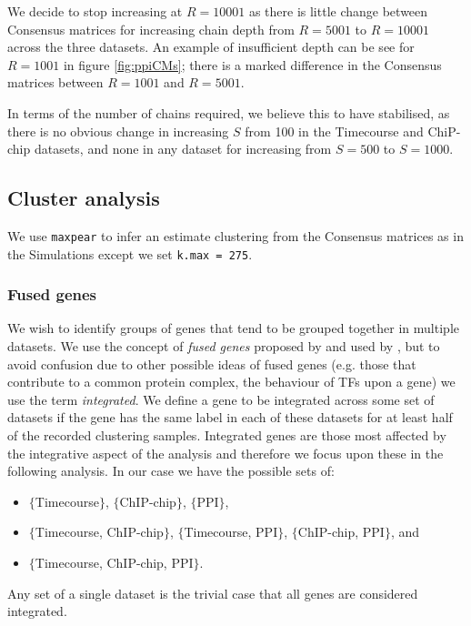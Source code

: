 \documentclass[]{article}
\begin{document}
We decide to stop increasing at $R=10001$ as there is little change between Consensus matrices for increasing chain depth from $R=5001$ to $R=10001$ across the three datasets. An example of insufficient depth can be see for $R=1001$ in figure \ref{fig:ppiCMs}; there is a marked difference in the Consensus matrices between $R=1001$ and $R=5001$. 

In terms of the number of chains required, we believe this to have stabilised, as there is no obvious change in increasing $S$ from 100 in the Timecourse and ChiP-chip datasets, and none in any dataset for increasing from $S=500$ to $S=1000$.

\subsection{Cluster analysis}
We use \texttt{maxpear} to infer an estimate clustering from the Consensus matrices as in the Simulations except we set \texttt{k.max = 275}. 



\subsubsection{Fused genes}
We wish to identify groups of genes that tend to be grouped together in multiple datasets. We use the concept of \emph{fused genes} proposed by \cite{savage2010discovering} and used by \cite{kirk2012bayesian}, but to avoid confusion due to other possible ideas of fused genes (e.g. those that contribute to a common protein complex, the behaviour of TFs upon a gene) we use the term \emph{integrated}. We define a gene to be integrated across some set of datasets if the gene has the same label in each of these datasets for at least half of the recorded clustering samples. Integrated genes are those most affected by the integrative aspect of the analysis and therefore we focus upon these in the following analysis. In our case we have the possible sets of:
\begin{itemize}
	\item $\{$Timecourse$\}$, $\{$ChIP-chip$\}$, $\{$PPI$\}$,
	\item $\{$Timecourse, ChIP-chip$\}$, $\{$Timecourse, PPI$\}$, $\{$ChIP-chip, PPI$\}$, and
	\item $\{$Timecourse, ChIP-chip, PPI$\}$.
\end{itemize}
Any set of a single dataset is the trivial case that all genes are considered integrated.
\end{document}
